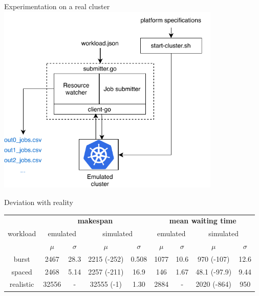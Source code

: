 \documentclass[12pt, aspectratio=43]{beamer}
\begin{document}
\begin{frame}{Experimentation on a real cluster}
	\centering
	\includegraphics[width=0.8\textwidth]{../imgs/expe-protocole-v2.pdf}
\end{frame}

\begin{frame}{Deviation with reality}
	\centering
	\begin{adjustbox}{max width=\textwidth}
		\begin{tabular}{|c|c|c|c|c|c|c|c|c|}
			\hline

			\multirow{3}{*}{workload} & \multicolumn{4}{c|}{\textbf{makespan}} & \multicolumn{4}{c|}{\textbf{mean waiting time}}\\

			\cline{2-9}

			& \multicolumn{2}{c|}{emulated} &
			\multicolumn{2}{c|}{simulated} & \multicolumn{2}{c|}{emulated}
			& \multicolumn{2}{c|}{simulated} \\

			\cline{2-9}

			& $\mu$ & $\sigma$ & $\mu$ & $\sigma$ & $\mu$ & $\sigma$ & $\mu$ & $\sigma$ \\

			\hline

			burst & 2467 & 28.3 & 2215 (-252) & 0.508 & 1077 & 10.6 & 970 (-107) & 12.6 \\
			spaced & 2468 & 5.14 & 2257 (-211) & 16.9 & 146 & 1.67 & 48.1 (-97.9) & 9.44 \\
			realistic & 32556 & - & 32555 (-1) & 1.30 & 2884 & - & 2020 (-864) & 950 \\
			\hline
		\end{tabular}
	\end{adjustbox}
\end{frame}
\end{document}
